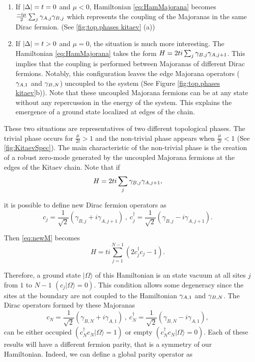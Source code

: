 \begin{enumerate}

  \item If $\vert \Delta \vert = t = 0$ and $\mu <0$, Hamiltonian \eqref{eq:HamMajorana} becomes $\frac{-i\mu}{2} \sum_{j} \gamma_{A,j}\gamma_{B,j}$ which represents the coupling of the Majoranas in the same Dirac fermion. (See \ref{fig:top.phases kitaev} (a))

  \item If $\vert \Delta \vert = t > 0$ and $\mu =0$, the situation is much more interesting. The Hamiltonian \eqref{eq:HamMajorana} takes the form $H = 2ti\sum_{j}  \gamma_{B,j}\gamma_{A,j+1} $. This implies that the coupling is performed between  Majoranas of different Dirac fermions. Notably, this configuration leaves the edge Majorana operators ($\gamma_{A,1}$ and $\gamma_{B,N}$) uncoupled to the system (See Figure \ref{fig:top.phases kitaev}b)). Note that these uncoupled Majorana fermions can be at any state without any  repercussion in the energy of the system. This explains the emergence of a  ground state localized at edges of the chain. 
\end{enumerate}

These two situations are representatives of two different topological phases. The trivial phase occurs for $\frac{\mu}{2t}>1$ and the non-trivial phase appears when $\frac{\mu}{2t}<1$ (See \ref{fig:KitaevSpec}). The main characteristic of the non-trivial phase  is the creation of a robust zero-mode generated by the  uncoupled Majorana fermions at the edges of the Kitaev chain. Note that if
\begin{equation}
H = 2ti\sum_{j}  \gamma_{B,j}\gamma_{A,j+1}, \label{eq:newM} 
\end{equation}
  
\noindent it is possible to define new Dirac fermion operators as 
$$c_j = \frac{1}{\sqrt{2}} \left( \gamma_{B,j}+ i\gamma_{A,j+1} \right) \ , \ c^\dagger_j = \frac{1}{\sqrt{2}} \left( \gamma_{B,j}- i\gamma_{A,j+1} \right). $$

\noindent Then \eqref{eq:newM} becomes 
\begin{equation}
H = ti\sum_{j=1}^{N-1} \left(  2c^\dagger_jc_j-1 \right). \label{eq:newM2} 
\end{equation}

Therefore, a ground state $\vert \Omega \rangle$ of this Hamiltonian is an state vacuum at all sites $j$ from $1$ to $N-1$ $(c_j\vert \Omega \rangle = 0)$. This condition allows some degeneracy since the sites at the boundary are not coupled to the Hamiltonian $\gamma_{A,1}$ and $\gamma_{B,N}$. The Dirac  operators formed by these Majoranas 
$$c_N = \frac{1}{\sqrt{2}} \left( \gamma_{B,N}+ i\gamma_{A,1} \right) \ , \ c^\dagger_N = \frac{1}{\sqrt{2}} \left( \gamma_{B,N}- i\gamma_{A,1} \right), $$ 
can be either occupied $(c^\dagger_N c_N \vert \Omega \rangle = 1)$ or empty $(c^\dagger_N c_N \vert \Omega \rangle = 0)$. Each of these results will have a different fermion parity, that is a  symmetry of our Hamiltonian.   Indeed, we can define a global parity operator as 

